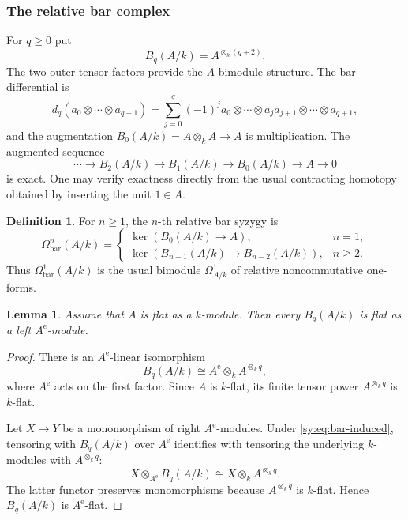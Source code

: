 \documentclass[11pt]{article}
\numberwithin{equation}{section}
\newtheorem{lemma}[theorem]{Lemma}
\theoremstyle{definition}
\newtheorem{definition}[theorem]{Definition}
\theoremstyle{remark}
\begin{document}
\subsubsection{The relative bar complex}

For $q\geq0$ put
\[
B_q(A/k)=A^{\otimes_k(q+2)}.
\]
The two outer tensor factors provide the $A$-bimodule structure.  The bar
differential is
\[
d_q(a_0\otimes\cdots\otimes a_{q+1})
 =\sum_{j=0}^{q}(-1)^j
 a_0\otimes\cdots\otimes a_ja_{j+1}\otimes\cdots\otimes a_{q+1},
\]
and the augmentation $B_0(A/k)=A\otimes_kA\to A$ is multiplication.
The augmented sequence
\begin{equation}
\cdots\longrightarrow B_2(A/k)\longrightarrow B_1(A/k)
\longrightarrow B_0(A/k)\longrightarrow A\longrightarrow0
\label{sy:eq:relative-bar}
\end{equation}
is exact.  One may verify exactness directly from the usual contracting
homotopy obtained by inserting the unit $1\in A$.

\begin{definition}\label{sy:def:bar-syzygy}
For $n\geq1$, the $n$-th relative bar syzygy is
\[
\Omega^n_{\mathrm{bar}}(A/k)=
\begin{cases}
\ker(B_0(A/k)\to A),& n=1,\\[1mm]
\ker(B_{n-1}(A/k)\to B_{n-2}(A/k)),& n\geq2.
\end{cases}
\]
Thus $\Omega^1_{\mathrm{bar}}(A/k)$ is the usual bimodule
$\Omega^1_{A/k}$ of relative noncommutative one-forms.
\end{definition}

\begin{lemma}
\label{sy:lem:bar-flat}
Assume that $A$ is flat as a $k$-module.  Then every $B_q(A/k)$ is flat as
a left $A^{\mathrm e}$-module.
\end{lemma}

\begin{proof}
There is an $A^{\mathrm e}$-linear isomorphism
\begin{equation}
B_q(A/k)\cong A^{\mathrm e}\otimes_k A^{\otimes_k q},
\label{sy:eq:bar-induced}
\end{equation}
where $A^{\mathrm e}$ acts on the first factor.  Since $A$ is $k$-flat,
its finite tensor power $A^{\otimes_k q}$ is $k$-flat.

Let $X\to Y$ be a monomorphism of right $A^{\mathrm e}$-modules.  Under
\eqref{sy:eq:bar-induced}, tensoring with $B_q(A/k)$ over $A^{\mathrm e}$
identifies with tensoring the underlying $k$-modules with
$A^{\otimes_k q}$:
\[
X\otimes_{A^{\mathrm e}}B_q(A/k)
\cong X\otimes_k A^{\otimes_k q}.
\]
The latter functor preserves monomorphisms because
$A^{\otimes_k q}$ is $k$-flat.  Hence $B_q(A/k)$ is
$A^{\mathrm e}$-flat.
\end{proof}
\end{document}
